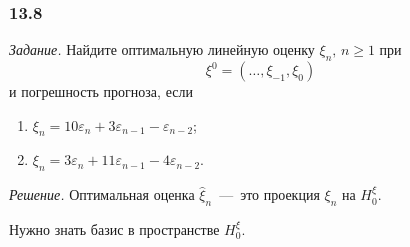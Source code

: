 \subsubsection*{13.8}

\textit{Задание.}
Найдите оптимальную линейную оценку $ \xi_n, \, n \geq 1$ при
\begin{equation*}
  \xi^0 =
  \left( \dotsc, \xi_{-1}, \xi_0 \right)
\end{equation*}
и погрешность прогноза, если
\begin{enumerate}[label=\alph*)]
  \item $ \xi_n = 10 \varepsilon_n + 3 \varepsilon_{n - 1} - \varepsilon_{n - 2}$;
  \item $ \xi_n = 3 \varepsilon_n + 11 \varepsilon_{n - 1} - 4 \varepsilon_{n - 2}$.
\end{enumerate}

\textit{Решение.}
Оптимальная оценка $ \hat{ \xi }_n$~---~это проекция $ \xi_n$ на $H_0^{ \xi }$.

Нужно знать базис в пространстве $H_0^{ \xi }$.

